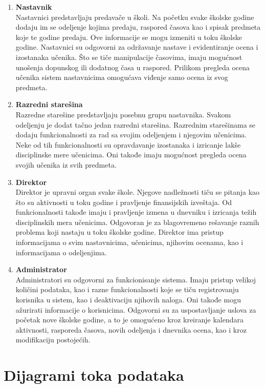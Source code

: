 \documentclass{article}
\begin{document}
\begin{enumerate}
	\item \textbf{Nastavnik} \\
	Nastavnici predstavljaju predavače u školi. Na početku svake školske godine dodaju im se odeljenje kojima predaju, raspored časova kao i spisak predmeta koje te godine predaju. Ove informacije se mogu izmeniti u toku školske godine. Nastavnici su odgovorni za održavanje nastave i evidentiranje ocena i izostanaka učenika. Što se tiče manipulacije časovima, imaju mogućnost unošenja dopunskog ili dodatnog časa u raspored. Prilikom pregleda ocena učenika sistem nastavnicima omogućava viđenje samo ocena iz svog predmeta.
	\item \textbf{Razredni starešina} \\
	Razredne starešine predstavljaju posebnu grupu nastavnika. Svakom odeljenju je dodat tačno jedan razredni starešina. Razrednim starešinama se dodaju funkcionalnosti za rad sa svojim odeljenjem i njegovim učenicima. Neke od tih funkcionalnosti su opravdavanje izostanaka i izricanje lakše disciplinske mere učenicima. Oni takođe imaju mogućnost pregleda ocena svojih učenika iz svih predmeta.
	\item \textbf{Direktor} \\
	 Direktor je upravni organ svake škole. Njegove nadležnosti tiču se pitanja kao što su aktivnosti u toku godine i pravljenje finansijskih izveštaja. Od funkcionalnosti takođe imaju i pravljenje izmena u dnevniku i izricanja težih disciplinskih mera učenicima. Odgovoran je za blagovremeno rešavanje raznih problema koji nastaju u toku školske godine. Direktor ima pristup informacijama o svim nastavnicima, učenicima, njihovim ocenama, kao i informacijama o odeljenjima.
	\item \textbf{Administrator} \\ 
	Administratori su odgovorni za funkcionisanje sistema. Imaju pristup velikoj količini podataka, kao i razne funkcionalnosti koje se tiču registrovanju korisnika u sistem, kao i deaktivaciju njihovih naloga. Oni takođe mogu ažurirati informacije o korisnicima. Odgovorni su za uspostavljanje uslova za početak nove školske godine, a to je omogućeno kroz kreiranje kalendara aktivnosti, rasporeda časova, novih odeljenja i dnevnika ocena, kao i kroz modifikaciju postojećih.
\end{enumerate}

\newpage
\section{Dijagrami toka podataka}
\end{document}
